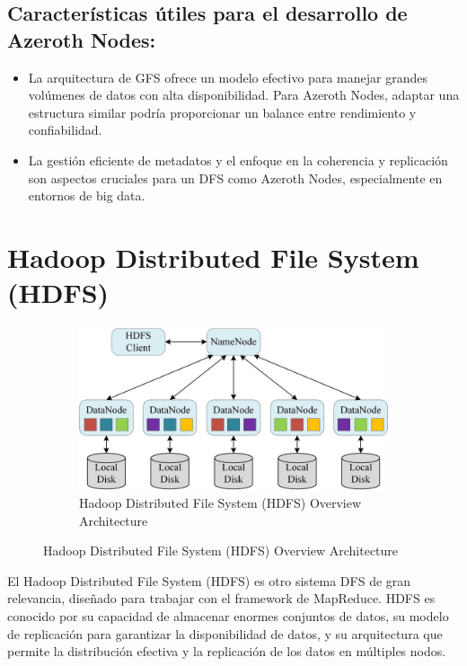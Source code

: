 \subsection{Características útiles para el desarrollo de Azeroth Nodes:}

\begin{itemize}
    \item La arquitectura de GFS ofrece un modelo efectivo para manejar grandes volúmenes de datos con alta disponibilidad. Para Azeroth Nodes, adaptar una estructura similar podría proporcionar un balance entre rendimiento y confiabilidad.
    \item La gestión eficiente de metadatos y el enfoque en la coherencia y replicación son aspectos cruciales para un DFS como Azeroth Nodes, especialmente en entornos de big data.
\end{itemize}

\section{Hadoop Distributed File System (HDFS)}

\begin{figure}[H]
    \centering
    \begin{subfigure}[b]{0.8\textwidth}
        \centering
        \includegraphics[width=\textwidth]{Figures/1. Content/Hadoop-Distributed-File-System-HDFS.png}
        \caption{Hadoop Distributed File System (HDFS) Overview Architecture}
        \label{fig: HDFSArchitecture}
    \end{subfigure}
    \hfill
\end{figure}

El Hadoop Distributed File System (HDFS) es otro sistema DFS de gran relevancia, diseñado para trabajar con el framework de MapReduce. HDFS es conocido por su capacidad de almacenar enormes conjuntos de datos, su modelo de replicación para garantizar la disponibilidad de datos, y su arquitectura que permite la distribución efectiva y la replicación de los datos en múltiples nodos.

